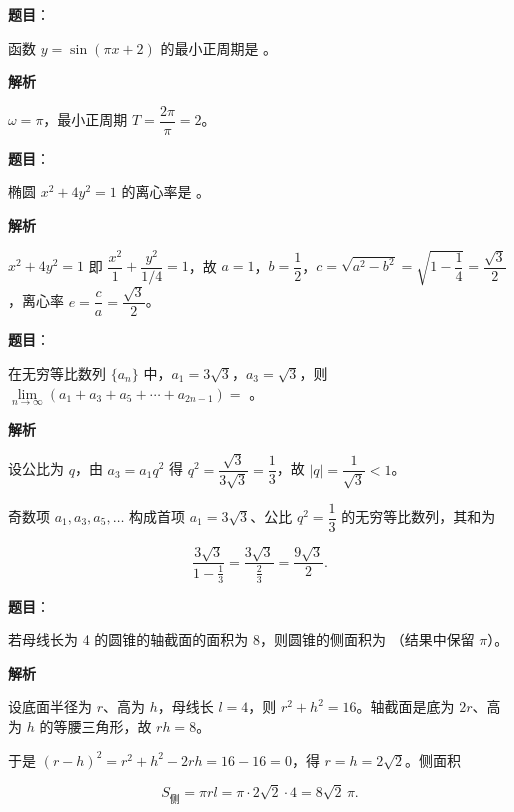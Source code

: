 \begin{answer}

\textbf{题目}：

函数 $y=\sin(\pi x+2)$ 的最小正周期是 \gkblank{}。

\textbf{解析}

$\omega=\pi$，最小正周期 $T=\dfrac{2\pi}{\pi}=2$。


\end{answer}
\begin{answer}

\textbf{题目}：

椭圆 $x^{2}+4y^{2}=1$ 的离心率是 \gkblank{}。

\textbf{解析}

$x^{2}+4y^{2}=1$ 即 $\dfrac{x^{2}}{1}+\dfrac{y^{2}}{1/4}=1$，故 $a=1$，$b=\dfrac{1}{2}$，$c=\sqrt{a^{2}-b^{2}}=\sqrt{1-\dfrac{1}{4}}=\dfrac{\sqrt{3}}{2}$，离心率 $e=\dfrac{c}{a}=\dfrac{\sqrt{3}}{2}$。


\end{answer}
\begin{answer}

\textbf{题目}：

在无穷等比数列 $\{a_{n}\}$ 中，$a_{1}=3\sqrt{3}$，$a_{3}=\sqrt{3}$，则 $\lim\limits_{n\to\infty}(a_{1}+a_{3}+a_{5}+\cdots+a_{2n-1})=$ \gkblank{}。

\textbf{解析}

设公比为 $q$，由 $a_{3}=a_{1}q^{2}$ 得 $q^{2}=\dfrac{\sqrt{3}}{3\sqrt{3}}=\dfrac{1}{3}$，故 $|q|=\dfrac{1}{\sqrt{3}}<1$。

奇数项 $a_{1},a_{3},a_{5},\dots$ 构成首项 $a_{1}=3\sqrt{3}$、公比 $q^{2}=\dfrac{1}{3}$ 的无穷等比数列，其和为

\nopagebreak[4]
\[
\frac{3\sqrt{3}}{1-\frac{1}{3}}=\frac{3\sqrt{3}}{\frac{2}{3}}=\frac{9\sqrt{3}}{2}.
\]


\end{answer}
\begin{answer}

\textbf{题目}：

若母线长为 4 的圆锥的轴截面的面积为 8，则圆锥的侧面积为 \gkblank{}（结果中保留 $\pi$）。

\textbf{解析}

设底面半径为 $r$、高为 $h$，母线长 $l=4$，则 $r^{2}+h^{2}=16$。轴截面是底为 $2r$、高为 $h$ 的等腰三角形，故 $rh=8$。

于是 $(r-h)^{2}=r^{2}+h^{2}-2rh=16-16=0$，得 $r=h=2\sqrt{2}$。侧面积

\nopagebreak[4]
\[
S_{\text{侧}}=\pi r l=\pi\cdot 2\sqrt{2}\cdot 4=8\sqrt{2}\,\pi.
\]


\end{answer}
